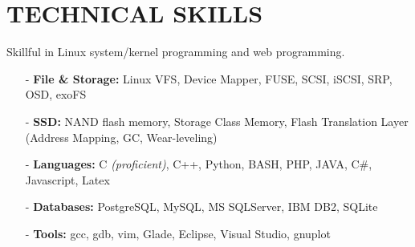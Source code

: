 \section{TECHNICAL SKILLS}
\vspace{0.07in}
Skillful in Linux system/kernel programming and web programming.
\begin{itemize}[leftmargin=*]
\setlength\itemsep{-0.02in}
\item[-] {\bf File \& Storage:} Linux VFS, Device Mapper, FUSE, SCSI, iSCSI, SRP, OSD,
exoFS
\item[-] {\bf SSD:} NAND flash memory, Storage Class Memory,
	Flash Translation Layer (Address Mapping, GC, Wear-leveling)
\item[-] {\bf Languages:} C {\footnotesize \it (proficient)}, C++,
	Python, BASH, PHP, JAVA, C\#,
	Javascript, Latex
\item[-] {\bf Databases:} PostgreSQL, MySQL, MS SQLServer, IBM DB2, SQLite
\item[-] {\bf Tools:} gcc, gdb, vim, Glade, Eclipse, Visual Studio, gnuplot
\end{itemize}

